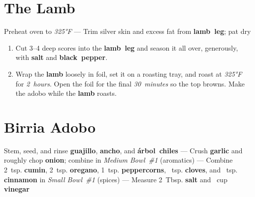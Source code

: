 \documentclass[11pt,letterpaper]{article}
\begin{document}
\filbreak
\section*{The Lamb}

\noindent
Preheat oven to \textit{325°F} ---
Trim silver skin and excess fat from \textbf{lamb~leg}; pat dry

\begin{enumerate}
    \item Cut 3--4 deep scores into the \textbf{lamb~leg} and season it all over, generously, with \textbf{salt} and \textbf{black~pepper}.
    \item Wrap the \textbf{lamb} loosely in foil, set it on a roasting tray, and roast at \textit{325°F} for \textit{2~hours}. Open the foil for the final \textit{30~minutes} so the top browns. Make the adobo while the \textbf{lamb} roasts.
\end{enumerate}

\filbreak
\section*{Birria Adobo}

\noindent
Stem, seed, and rinse \textbf{guajillo}, \textbf{ancho}, and \textbf{árbol~chiles} ---
Crush \textbf{garlic} and roughly chop \textbf{onion}; combine in \textit{Medium Bowl~\#1} (aromatics) ---
Combine 2~tsp. \textbf{cumin}, 2~tsp. \textbf{oregano}, 1~tsp. \textbf{peppercorns}, ~tsp. \textbf{cloves}, and ~tsp. \textbf{cinnamon} in \textit{Small Bowl~\#1} (spices) ---
Measure 2~Tbsp. \textbf{salt} and ~cup \textbf{vinegar}
\end{document}
